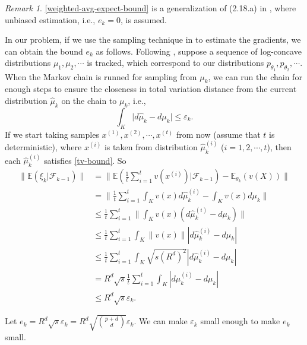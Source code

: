\documentclass[psamsfonts]{article}
\theoremstyle{definition}
\theoremstyle{remark}
\newtheorem*{rem}{Remark}
\numberwithin{equation} {section}
\begin{document}
\begin{rem}
\eqref{weighted-avg-expect-bound} is a generalization of (2.18.a) in \cite{robust-sa}, where unbiased estimation, i.e., $e_k=0$, is assumed.
\end{rem}

In our problem, if we use the sampling technique in \cite{time-varying-sample} to estimate the gradients, we can obtain the bound $e_k$ as follows. Following \cite{time-varying-sample}, suppose a sequence of log-concave distributions $\mu_1, \mu_2, \cdots$ is tracked, which correspond to our distributions $p_{\theta_1}, p_{\theta_2}, \cdots$. When the Markov chain is runned for sampling from $\mu_k$, we can run the chain for enough steps to ensure the closeness in total variation distance from the current distribution $\hat{\mu}_k$ on the chain to $\mu_k$, i.e.,
\begin{equation}\label{tv-bound}
\int_{K}\big| d\hat{\mu}_k - d\mu_k\big| \le \varepsilon_k.
\end{equation}
If we start taking samples $x^{(1)}, x^{(2)}, \cdots, x^{(t)}$ from now (assume that $t$ is deterministic), where $x^{(i)}$ is taken from distribution $\hat{\mu}_k^{(i)}$ ($i=1,2,\cdots,t$), then each $\hat{\mu}_k^{(i)}$ satisfies \eqref{tv-bound}. So
\begin{equation}
\begin{aligned}
\|\mathbb E(\xi_k|\mathcal F_{k-1}) \| &= \| \mathbb E(\frac{1}{t}\sum_{i=1}^t v(x^{(i)})|\mathcal F_{k-1}) - \mathbb E_{\theta_k}(v(X)) \|\\
&= \|\frac{1}{t}\sum_{i=1}^t\int_K v(x)d\hat{\mu}_k^{(i)} - \int_K v(x)d\mu_k\|\\
&\le \frac{1}{t}\sum_{i=1}^t \|\int_K v(x)(d\hat{\mu}_k^{(i)} - d\mu_k)\|\\
&\le \frac{1}{t}\sum_{i=1}^t \int_K \|v(x)\| |d\hat{\mu}_k^{(i)} - d\mu_k|\\
&\le \frac{1}{t}\sum_{i=1}^t \int_K \sqrt{s(R^d)^2} |d\hat{\mu}_k^{(i)} - d\mu_k|\\
&= R^d\sqrt{s} \frac{1}{t}\sum_{i=1}^t \int_K|d\hat{\mu}_k^{(i)} - d\mu_k|\\
&\le R^d\sqrt{s}\varepsilon_k.
\end{aligned}
\end{equation}

Let $e_k = R^d\sqrt{s}\varepsilon_k = R^d\sqrt{p+d\choose d}\varepsilon_k$. We can make $\varepsilon_k$ small enough to make $e_k$ small.
\end{document}
